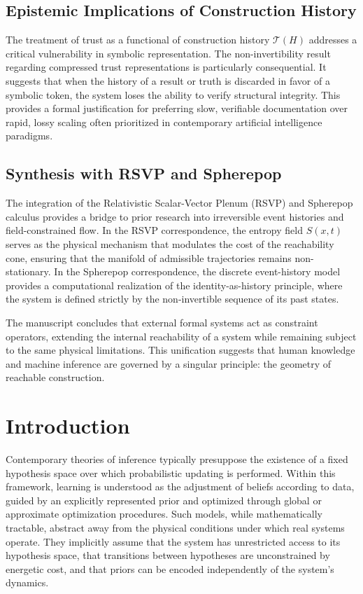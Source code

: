 \documentclass[12pt]{article}
\theoremstyle{plain}
\theoremstyle{definition}
\theoremstyle{remark}
\begin{document}
\subsection*{Epistemic Implications of Construction History}

The treatment of trust as a functional of construction history $\mathcal{T}(H)$ addresses a critical vulnerability in symbolic representation. The non-invertibility result regarding compressed trust representations is particularly consequential. It suggests that when the history of a result or truth is discarded in favor of a symbolic token, the system loses the ability to verify structural integrity. This provides a formal justification for preferring slow, verifiable documentation over rapid, lossy scaling often prioritized in contemporary artificial intelligence paradigms.

\subsection*{Synthesis with RSVP and Spherepop}

The integration of the Relativistic Scalar-Vector Plenum (RSVP) and Spherepop calculus provides a bridge to prior research into irreversible event histories and field-constrained flow. In the RSVP correspondence, the entropy field $S(x,t)$ serves as the physical mechanism that modulates the cost of the reachability cone, ensuring that the manifold of admissible trajectories remains non-stationary. In the Spherepop correspondence, the discrete event-history model provides a computational realization of the identity-as-history principle, where the system is defined strictly by the non-invertible sequence of its past states.

The manuscript concludes that external formal systems act as constraint operators, extending the internal reachability of a system while remaining subject to the same physical limitations. This unification suggests that human knowledge and machine inference are governed by a singular principle: the geometry of reachable construction.

\bigskip

\section{Introduction}

Contemporary theories of inference typically presuppose the existence of a fixed hypothesis space over which probabilistic updating is performed. Within this framework, learning is understood as the adjustment of beliefs according to data, guided by an explicitly represented prior and optimized through global or approximate optimization procedures. Such models, while mathematically tractable, abstract away from the physical conditions under which real systems operate. They implicitly assume that the system has unrestricted access to its hypothesis space, that transitions between hypotheses are unconstrained by energetic cost, and that priors can be encoded independently of the system's dynamics.
\end{document}
